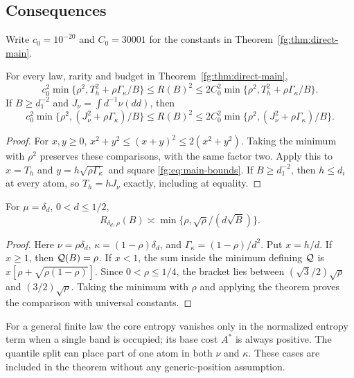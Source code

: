 \subsection{Consequences}\label{fg:sec:consequences}
Write $c_0=10^{-20}$ and $C_0=30001$ for the constants in
Theorem~\ref{fg:thm:direct-main}.

\begin{corollary}\label{fg:cor:mse}
For every law, rarity and budget in Theorem~\ref{fg:thm:direct-main},
\[
 c_0^2\min\{\rho^2,T_h^2+\rho\Gamma_\kappa/B\}
 \le R(B)^2
 \le2C_0^2\min\{\rho^2,T_h^2+\rho\Gamma_\kappa/B\}.
\]
If $B\ge d_1^{-2}$ and $J_\nu=\int d^{-1}\nu(dd)$, then
\[
 c_0^2\min\{\rho^2,(J_\nu^2+\rho\Gamma_\kappa)/B\}
 \le R(B)^2
 \le2C_0^2\min\{\rho^2,(J_\nu^2+\rho\Gamma_\kappa)/B\}.
\]
\end{corollary}
\begin{proof}
For $x,y\ge0$, $x^2+y^2\le(x+y)^2\le2(x^2+y^2)$.
Taking the minimum with $\rho^2$ preserves these comparisons,
with the same factor two. Apply this to $x=T_h$ and
$y=h\sqrt{\rho\Gamma_\kappa}$ and square
\eqref{fg:eq:main-bounds}. If $B\ge d_1^{-2}$, then $h\le d_i$
at every atom, so $T_h=hJ_\nu$ exactly, including at equality.
\end{proof}

\begin{corollary}\label{fg:cor:one-gap}
For $\mu=\delta_d$, $0<d\le1/2$,
\[
 R_{\delta_d,\rho}(B)\asymp
       \min\{\rho,\sqrt{\rho}/(d\sqrt B)\}.
\]
\end{corollary}
\begin{proof}
Here $\nu=\rho\delta_d$, $\kappa=(1-\rho)\delta_d$, and
$\Gamma_\kappa=(1-\rho)/d^2$. Put $x=h/d$. If $x\ge1$,
then $\mathcal Q(B)=\rho$. If $x<1$, the sum inside the minimum
defining $\mathcal Q$ is $x[\rho+\sqrt{\rho(1-\rho)}]$.
Since $0<\rho\le1/4$, the bracket lies between
$(\sqrt3/2)\sqrt\rho$ and $(3/2)\sqrt\rho$.
Taking the minimum with $\rho$ and applying the theorem proves
the comparison with universal constants.
\end{proof}

For a general finite law the core entropy vanishes only in the
normalized entropy term when a single band is occupied; its base
cost $A^*$ is always positive. The quantile split can place part
of one atom in both $\nu$ and $\kappa$. These cases are included
in the theorem without any generic-position assumption.

